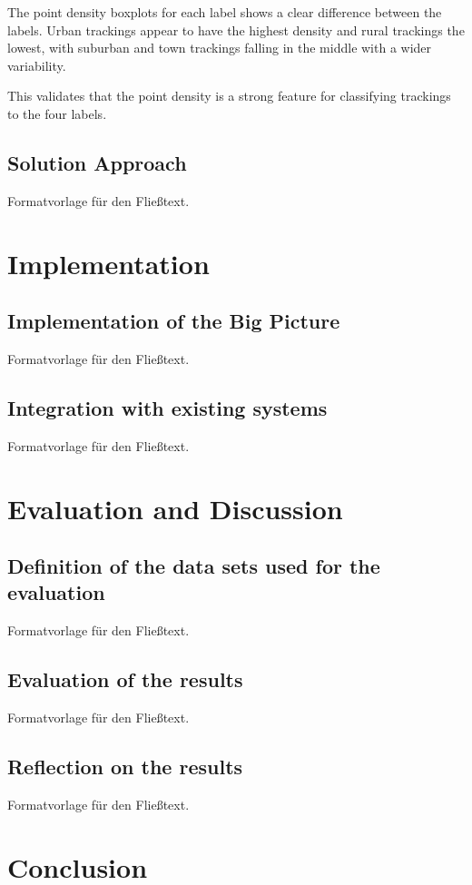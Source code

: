 \documentclass[a4paper,12pt,twoside]{scrreprt}
\begin{document}
The point density boxplots for each label shows a clear difference between the
labels. Urban trackings appear to have the highest density and rural trackings
the lowest, with suburban and town trackings falling in the middle with a wider
variability.

This validates that the point density is a strong feature for classifying
trackings to the four labels.

\section{Solution Approach}
Formatvorlage für den Fließtext.

\chapter{Implementation}

\section{Implementation of the Big Picture}
Formatvorlage für den Fließtext.

\section{Integration with existing systems}
Formatvorlage für den Fließtext.

\chapter{Evaluation and Discussion}

\section{Definition of the data sets used for the evaluation}
Formatvorlage für den Fließtext.

\section{Evaluation of the results}
Formatvorlage für den Fließtext.

\section{Reflection on the results}
Formatvorlage für den Fließtext.

\chapter{Conclusion}
\end{document}
